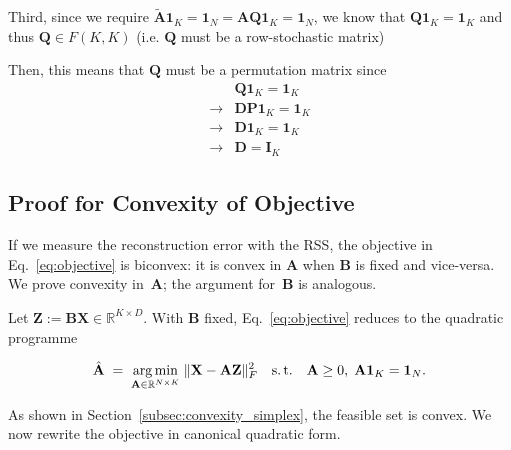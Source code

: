 \documentclass[oneside]{article}
\begin{document}
Third, since we require $\tilde{\mathbf{A}} \mathbf{1}_K = \mathbf{1}_N = \mathbf{A} \mathbf{Q} \mathbf{1}_K = \mathbf{1}_N$, we know that $\mathbf{Q} \mathbf{1}_K = \mathbf{1}_K$ and thus $\mathbf{Q} \in F(K, K)$ (i.e. $\mathbf{Q}$ must be a row-stochastic matrix)

Then, this means that $\mathbf{Q}$ must be a permutation matrix since
\begin{equation}
    \begin{aligned}
        &\mathbf{Q} \mathbf{1}_K = \mathbf{1}_K \\
        \rightarrow &\mathbf{D} \mathbf{P} \mathbf{1}_K = \mathbf{1}_K \\
        \rightarrow &\mathbf{D} \mathbf{1}_K = \mathbf{1}_K \\
        \rightarrow &\mathbf{D} = \mathbf{I}_K
    \end{aligned}
\end{equation}


\subsection{Proof for Convexity of Objective}
\label{subsec:proof_convexity}

If we measure the reconstruction error with the RSS, the objective in Eq.~\eqref{eq:objective} is biconvex: it is convex in $\mathbf{A}$ when $\mathbf{B}$ is fixed and vice-versa. We prove convexity in~$\mathbf{A}$; the argument for~$\mathbf{B}$ is analogous.

Let $\mathbf Z := \mathbf{B} \mathbf{X} \in \mathbb R^{K\times D}$. With $\mathbf{B}$ fixed, Eq.~\eqref{eq:objective} reduces to the quadratic programme

\begin{equation}
\label{eq:A_subproblem}
    \hat{\mathbf{A}}\;=\;
    \underset{\mathbf{A}\in\mathbb R^{N\times K}}{\arg\min}\;
    \|\mathbf X-\mathbf{A}\mathbf Z\|_F^{2}
    \quad\text{s.\,t.}\quad
    \mathbf{A}\ge0,\;
    \mathbf{A}\mathbf 1_K=\mathbf 1_N .
\end{equation}

As shown in Section~\ref{subsec:convexity_simplex}, the feasible set is convex. We now rewrite the objective in canonical quadratic form.
\end{document}
